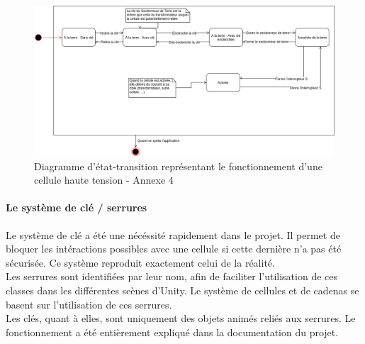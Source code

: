 \documentclass[a4paper]{article}
\begin{document}
    \begin{figure}[H]
        \centering
        \includegraphics[scale=0.4]{img/DiagEtatTransitionQM}
        \caption{Diagramme d'état-transition représentant le fonctionnement d'une cellule haute tension - Annexe 4}
    \end{figure} 

    \paragraph{Le système de clé / serrures}

    Le système de clé a été une nécéssité rapidement dans le projet. Il permet de bloquer les intéractions possibles avec une cellule si cette dernière n'a pas été sécurisée. Ce système reproduit exactement celui de la réalité. \\

    Les serrures sont identifiées par leur nom, afin de faciliter l'utilisation de ces classes dans les différentes scènes d'Unity. Le système de cellules et de cadenas se basent sur l'utilisation de ces serrures. \\

    Les clés, quant à elles, sont uniquement des objets animés reliés aux serrures. 
    Le fonctionnement a été entièrement expliqué dans la documentation du projet. \\
    
\end{document}
